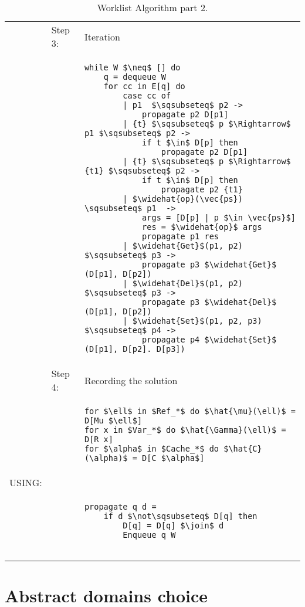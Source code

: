 \begin{table}[htb]
\small
\begin{center}
\begin{tabular}{l l l}
&Step 3: & Iteration\\
&&
\begin{lstlisting}[mathescape]
while W $\neq$ [] do
    q = dequeue W
    for cc in E[q] do
        case cc of
        | p1  $\sqsubseteq$ p2 -> 
            propagate p2 D[p1]
        | {t} $\sqsubseteq$ p $\Rightarrow$ p1 $\sqsubseteq$ p2 -> 
            if t $\in$ D[p] then
                propagate p2 D[p1]
        | {t} $\sqsubseteq$ p $\Rightarrow$ {t1} $\sqsubseteq$ p2 ->
            if t $\in$ D[p] then
                propagate p2 {t1}
        | $\widehat{op}(\vec{ps}) \sqsubseteq$ p1  -> 
            args = [D[p] | p $\in \vec{ps}$]
            res = $\widehat{op}$ args
            propagate p1 res
        | $\widehat{Get}$(p1, p2) $\sqsubseteq$ p3 -> 
            propagate p3 $\widehat{Get}$ (D[p1], D[p2]) 
        | $\widehat{Del}$(p1, p2) $\sqsubseteq$ p3 -> 
            propagate p3 $\widehat{Del}$ (D[p1], D[p2]) 
        | $\widehat{Set}$(p1, p2, p3) $\sqsubseteq$ p4 -> 
            propagate p4 $\widehat{Set}$ (D[p1], D[p2]. D[p3]) 
\end{lstlisting}\\
& Step 4: & Recording the solution\\
&&
\begin{lstlisting}[mathescape]
for $\ell$ in $Ref_*$ do $\hat{\mu}(\ell)$ = D[Mu $\ell$]
for x in $Var_*$ do $\hat{\Gamma}(\ell)$ = D[R x]
for $\alpha$ in $Cache_*$ do $\hat{C}(\alpha)$ = D[C $\alpha$]
\end{lstlisting}\\
USING: \\
&&
\begin{lstlisting}[mathescape]
propagate q d =
    if d $\not\sqsubseteq$ D[q] then
        D[q] = D[q] $\join$ d
        Enqueue q W
    
\end{lstlisting}\\
\end{tabular}
\end{center}
\caption{Worklist Algorithm part 2.}
\label{tab:Worklist2}
\end{table}

\section{Abstract domains choice} %
\label{sec:AbstractDomChoice}


